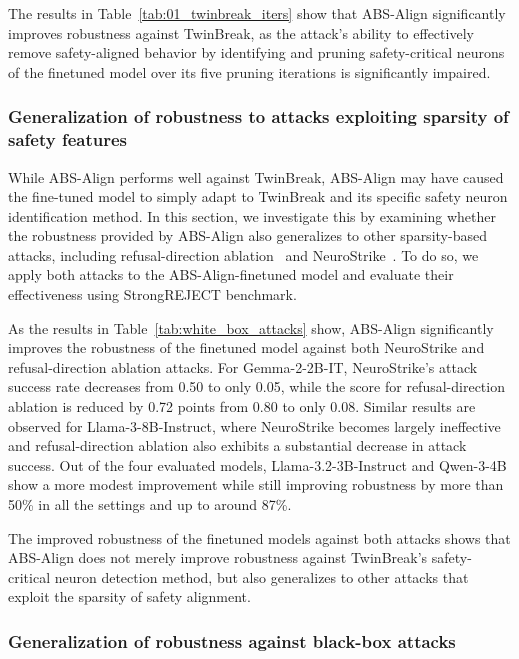 The results in Table~\ref{tab:01_twinbreak_iters} show that ABS-Align significantly improves robustness against TwinBreak, as the attack's ability to effectively remove safety-aligned behavior by identifying and pruning safety-critical neurons of the finetuned model over its five pruning iterations is significantly impaired. 




\subsubsection{Generalization of robustness to attacks exploiting sparsity of safety features}
\label{subsubsec:robustness_white_box}

While ABS-Align performs well against TwinBreak, ABS-Align may have caused the fine-tuned model to simply adapt to TwinBreak and its specific safety neuron identification method. In this section, we investigate this by examining whether the robustness provided by ABS-Align also generalizes to other sparsity-based attacks, including refusal-direction ablation~\cite{arditi2024refusal} and NeuroStrike~\cite{wu2026neurostrike}. To do so, we apply both attacks to the ABS-Align-finetuned model and evaluate their effectiveness using StrongREJECT benchmark.





As the results in Table~\ref{tab:white_box_attacks} show, ABS-Align significantly improves the robustness of the finetuned model against both NeuroStrike and refusal-direction ablation attacks. For Gemma-2-2B-IT, NeuroStrike's attack success rate decreases from 0.50 to only 0.05, while the score for refusal-direction ablation is reduced by 0.72 points from 0.80 to only 0.08. Similar results are observed for Llama-3-8B-Instruct, where NeuroStrike becomes largely ineffective and refusal-direction ablation also exhibits a substantial decrease in attack success. Out of the four evaluated models, Llama-3.2-3B-Instruct and Qwen-3-4B show a more modest improvement while still improving robustness by more than 50\% in all the settings and up to around 87\%.


The improved robustness of the finetuned models against both attacks shows that ABS-Align does not merely improve robustness against TwinBreak's safety-critical neuron detection method, but also generalizes to other attacks that exploit the sparsity of safety alignment.



\subsubsection{Generalization of robustness against black-box attacks}
\label{subsubsec:robustness_black_box}

